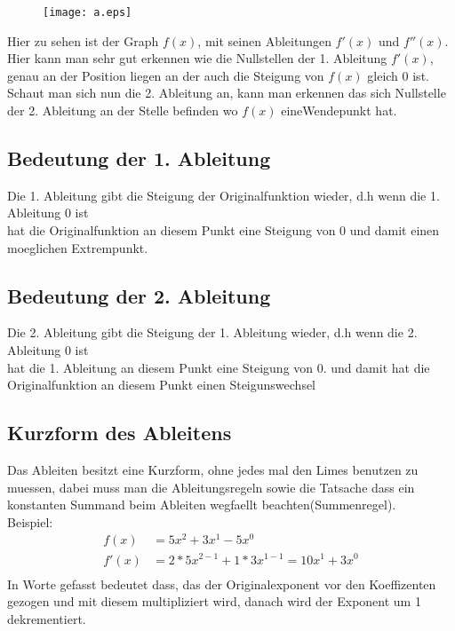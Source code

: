 \documentclass[a4paper]{article} %
\begin{document}
	\begin{minipage}{0.3\textwidth}
	\begin{figure}[H]
	\texttt{[image: a.eps]}
	\caption{}
	\end{figure}
	\end{minipage} \hfill
	\begin{minipage}{0.5\textwidth}
	
	Hier zu sehen ist der Graph $f(x)$, mit seinen Ableitungen $f'(x)$ und $f''(x)$.
	Hier kann man sehr gut erkennen wie die Nullstellen der 1. Ableitung $f'(x)$, genau an
	der Position liegen an der auch die Steigung von $f(x)$ gleich 0 ist.\\
	Schaut man sich nun die 2. Ableitung an, kann man erkennen das sich Nullstelle der 2. Ableitung an der Stelle befinden wo $f(x)$ eineWendepunkt hat.
	
	\end{minipage}


			
		
	\subsection{Bedeutung der 1. Ableitung}
	
	Die 1. Ableitung gibt die Steigung der Originalfunktion wieder, d.h wenn die 1. Ableitung 0 ist \\hat die Originalfunktion an diesem Punkt eine 
	Steigung von 0 und damit einen moeglichen Extrempunkt.
	
	\subsection{Bedeutung der 2. Ableitung}
	Die 2. Ableitung gibt die Steigung der 1. Ableitung wieder, d.h wenn die 2. Ableitung 0 ist \\hat die 1. Ableitung an diesem Punkt eine 
	Steigung von 0. und damit hat die Originalfunktion an diesem Punkt einen Steigunswechsel
	\subsection{Kurzform des Ableitens}
	
	Das Ableiten besitzt eine Kurzform, ohne jedes mal den Limes benutzen zu muessen, dabei muss man die Ableitungsregeln sowie die Tatsache dass ein konstanten Summand beim Ableiten wegfaellt beachten(Summenregel).
\\	Beispiel:\\
		\begin{align*}
	f(x)  &= 5x^2+3x^1-5x^0\\
	f'(x)  &= 2*5x^{2-1}+1*3x^{1-1} = 10x^1+3x^0\\
	\end{align*}
	In Worte gefasst bedeutet dass, das der Originalexponent vor den Koeffizenten gezogen und mit diesem multipliziert wird, danach wird der Exponent um 1 dekrementiert.
	
\end{document}
